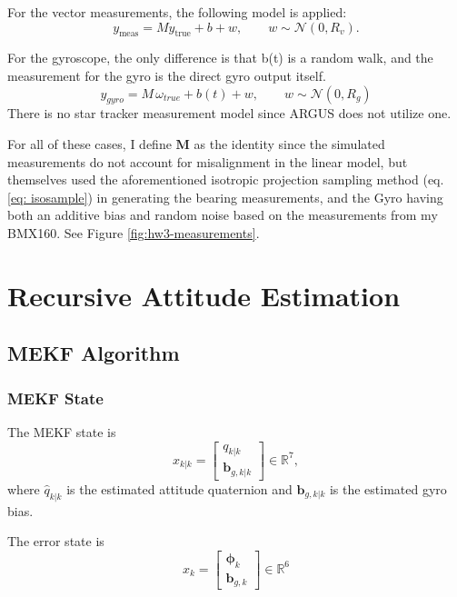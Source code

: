 \documentclass[conference,onecolumn,draftclsnofoot]{IEEEtran}
\begin{document}
For the vector measurements, the following model is applied:
\begin{equation}
y_{\mathrm{meas}}
=
M y_{\mathrm{true}} + b + w,
\qquad
w \sim \mathcal{N}(0,R_v).
\end{equation}

For the gyroscope, the only difference is that b(t) is a random walk, and the measurement for the gyro is the direct gyro output itself.
\begin{equation}
    y_{gyro} = M \, \omega_{true} + b(t) + w,
    \qquad
    w \sim \mathcal{N}(0,R_g)
\end{equation}
There is no star tracker measurement model since ARGUS does not utilize one.

For all of these cases, I define $\boldsymbol{M}$ as the identity since the simulated measurements do not account for misalignment in the linear model, but themselves used the aforementioned isotropic projection sampling method (eq. \ref{eq: isosample}) in generating the bearing measurements, and the Gyro having both an additive bias and random noise based on the measurements from my BMX160. See Figure \ref{fig:hw3-measurements}.

\clearpage
\section{Recursive Attitude Estimation}
\subsection{MEKF Algorithm}
\subsubsection{MEKF State}

The MEKF state is
\begin{equation}
x_{k|k}
=
\begin{bmatrix}
q_{k|k}\\
\mathbf b_{g,k|k}
\end{bmatrix}
\in\mathbb{R}^{7},
\end{equation}
where $\hat q_{k|k}$ is the estimated attitude quaternion and
${\mathbf b}_{g,k|k}$ is the estimated gyro bias.

The error state is
\begin{equation}
 x_k
=
\begin{bmatrix}
\boldsymbol{\phi}_k\\
\mathbf b_{g,k}
\end{bmatrix}
\in\mathbb R^6
\end{equation}
\end{document}
